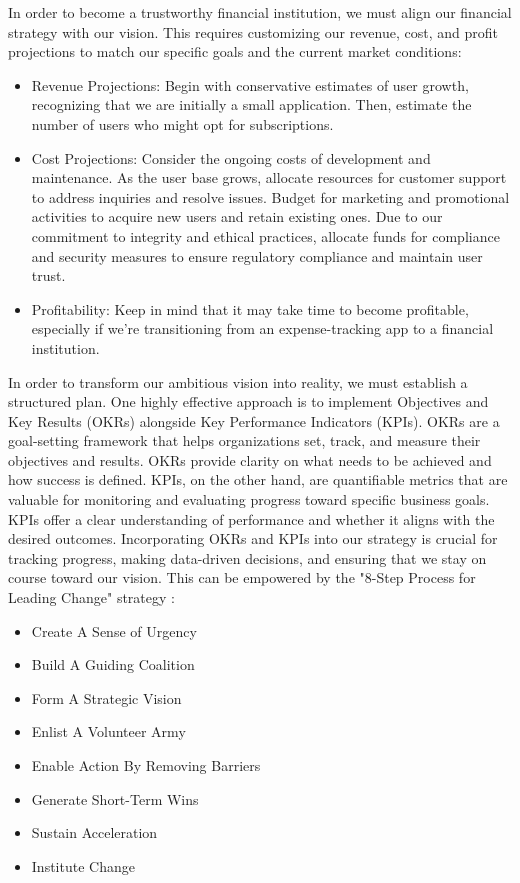 In order to become a trustworthy financial institution, we must align our financial strategy with our vision. This requires customizing our revenue, cost, and profit projections to match our specific goals and the current market conditions:

\begin{itemize}
  \item Revenue Projections: Begin with conservative estimates of user growth, recognizing that we are initially a small 
  application. Then, estimate the number of users who might opt for subscriptions.

  \item Cost Projections: Consider the ongoing costs of development and maintenance. As the user base grows, allocate 
  resources for customer support to address inquiries and resolve issues. Budget for marketing and promotional 
  activities to acquire new users and retain existing ones. Due to our commitment to integrity and ethical practices, 
  allocate funds for compliance and security measures to ensure regulatory compliance and maintain user trust.

  \item Profitability: Keep in mind that it may take time to become profitable, especially if we're transitioning from 
  an expense-tracking app to a financial institution.
\end{itemize}

\noindent In order to transform our ambitious vision into reality, we must establish a structured plan. One highly 
effective approach is to implement Objectives and Key Results (OKRs) alongside Key Performance Indicators (KPIs). OKRs 
are a goal-setting framework \cite{Doer18} that helps organizations set, track, and measure their objectives and 
results. OKRs provide clarity on what needs to be achieved and how success is defined. KPIs, on the other hand, are 
quantifiable metrics \cite{Marr12} that are valuable for monitoring and evaluating progress toward specific business 
goals. KPIs offer a clear understanding of performance and whether it aligns with the desired outcomes. Incorporating 
OKRs and KPIs into our strategy is crucial for tracking progress, making data-driven decisions, and ensuring that we 
stay on course toward our vision. This can be empowered by the "8-Step Process for Leading Change" strategy 
\cite{Kott12}:

\begin{itemize}
  \item Create A Sense of Urgency
  \item Build A Guiding Coalition
  \item Form A Strategic Vision
  \item Enlist A Volunteer Army
  \item Enable Action By Removing Barriers
  \item Generate Short-Term Wins
  \item Sustain Acceleration
  \item Institute Change
\end{itemize}

